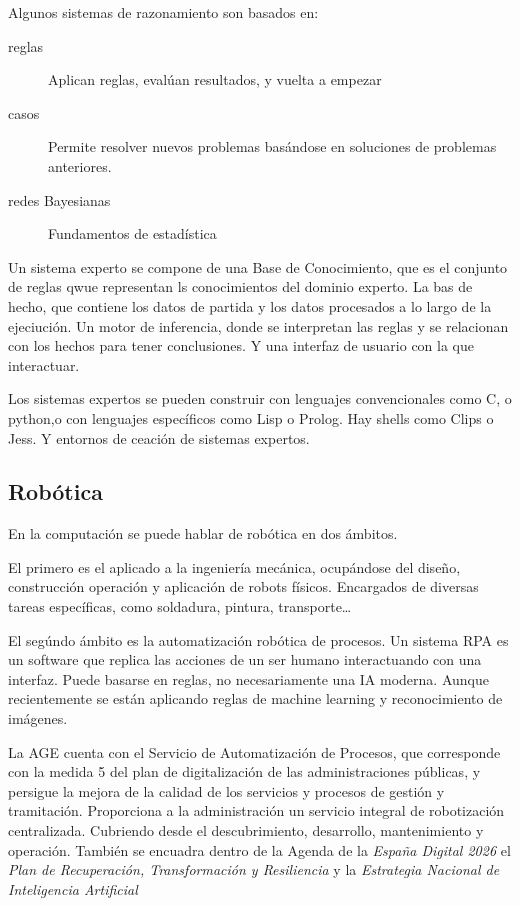     Algunos sistemas de razonamiento son basados en:
    \begin{description}
        \item[reglas] Aplican reglas, evalúan resultados, y vuelta a empezar
        \item[casos] Permite resolver nuevos problemas basándose en soluciones de problemas anteriores.
        \item[redes Bayesianas] Fundamentos de estadística
    \end{description}

    Un sistema experto se compone de una Base de Conocimiento, que es el conjunto de reglas qwue representan ls conocimientos del dominio experto. La bas de hecho, que contiene los datos de partida y los datos procesados a lo largo de la ejeciución. Un motor de inferencia, donde se interpretan las reglas y se relacionan con los hechos para tener conclusiones. Y una interfaz de usuario con la que interactuar.

    Los sistemas expertos se pueden construir con lenguajes convencionales como C, o python,o con lenguajes específicos como Lisp o Prolog. Hay shells como Clips o Jess. Y entornos de ceación de sistemas expertos.

\subsection{Robótica}
    En la computación se puede hablar de robótica en dos ámbitos.

    El primero es el aplicado a la ingeniería mecánica, ocupándose del diseño, construcción operación y aplicación de robots físicos. Encargados de diversas tareas específicas, como soldadura, pintura, transporte\dots

    El segúndo ámbito es la automatización robótica de procesos. Un sistema RPA es un software que replica las acciones de un ser humano interactuando con una interfaz. Puede basarse en reglas, no necesariamente una IA moderna. Aunque recientemente se están aplicando reglas de machine learning y reconocimiento de imágenes.

    La AGE cuenta con el Servicio de Automatización de Procesos, que corresponde con la medida 5 del plan de digitalización de las administraciones públicas, y persigue la mejora de la calidad de los servicios y procesos de gestión y tramitación. Proporciona a la administración un servicio integral de robotización centralizada. Cubriendo desde el descubrimiento, desarrollo, mantenimiento y operación. También se encuadra dentro de la Agenda de la \textit{España Digital 2026} el \textit{Plan de Recuperación, Transformación y Resiliencia} y la \textit{Estrategia Nacional de Inteligencia Artificial}

